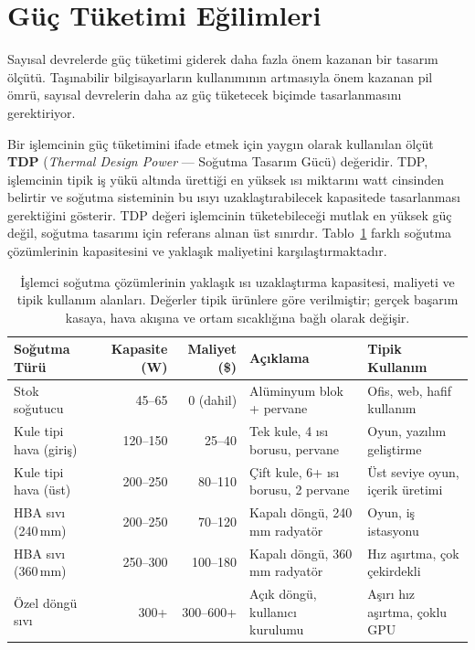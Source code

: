 \section{Güç Tüketimi Eğilimleri}
\label{sec:guc-tuketimi}

Sayısal devrelerde güç tüketimi giderek daha fazla önem kazanan bir tasarım ölçütü. Taşınabilir bilgisayarların kullanımının artmasıyla önem kazanan pil ömrü, sayısal devrelerin daha az güç tüketecek biçimde tasarlanmasını gerektiriyor.

Bir işlemcinin güç tüketimini ifade etmek için yaygın olarak kullanılan ölçüt \textbf{TDP} (\emph{Thermal Design Power} --- Soğutma Tasarım Gücü) değeridir. TDP, işlemcinin tipik iş yükü altında ürettiği en yüksek ısı miktarını watt cinsinden belirtir ve soğutma sisteminin bu ısıyı uzaklaştırabilecek kapasitede tasarlanması gerektiğini gösterir. TDP değeri işlemcinin tüketebileceği mutlak en yüksek güç değil, soğutma tasarımı için referans alınan üst sınırdır. Tablo~\ref{tab:sogutma-sistemleri} farklı soğutma çözümlerinin kapasitesini ve yaklaşık maliyetini karşılaştırmaktadır.

\begin{table}[ht!]
\centering
\caption[Soğutma çözümlerinin TDP kapasitesi ve maliyeti]{İşlemci soğutma çözümlerinin yaklaşık ısı uzaklaştırma kapasitesi, maliyeti ve tipik kullanım alanları. Değerler tipik ürünlere göre verilmiştir; gerçek başarım kasaya, hava akışına ve ortam sıcaklığına bağlı olarak değişir.}
\label{tab:sogutma-sistemleri}
\footnotesize
\begin{tabular}{lrrp{3.6cm}p{3.2cm}}
\toprule
\textbf{Soğutma Türü} & \textbf{Kapasite (W)} & \textbf{Maliyet (\$)} & \textbf{Açıklama} & \textbf{Tipik Kullanım} \\
\midrule
Stok soğutucu          & 45--65    & 0 (dahil)    & Alüminyum blok + pervane & Ofis, web, hafif kullanım \\
Kule tipi hava (giriş) & 120--150  & 25--40       & Tek kule, 4 ısı borusu, pervane & Oyun, yazılım geliştirme \\
Kule tipi hava (üst)   & 200--250  & 80--110      & Çift kule, 6+ ısı borusu, 2 pervane & Üst seviye oyun, içerik üretimi \\
HBA sıvı (240\,mm)     & 200--250  & 70--120      & Kapalı döngü, 240\,mm radyatör & Oyun, iş istasyonu \\
HBA sıvı (360\,mm)     & 250--300  & 100--180     & Kapalı döngü, 360\,mm radyatör & Hız aşırtma, çok çekirdekli \\
Özel döngü sıvı        & 300+      & 300--600+    & Açık döngü, kullanıcı kurulumu & Aşırı hız aşırtma, çoklu GPU \\
\bottomrule
\end{tabular}
\end{table}

